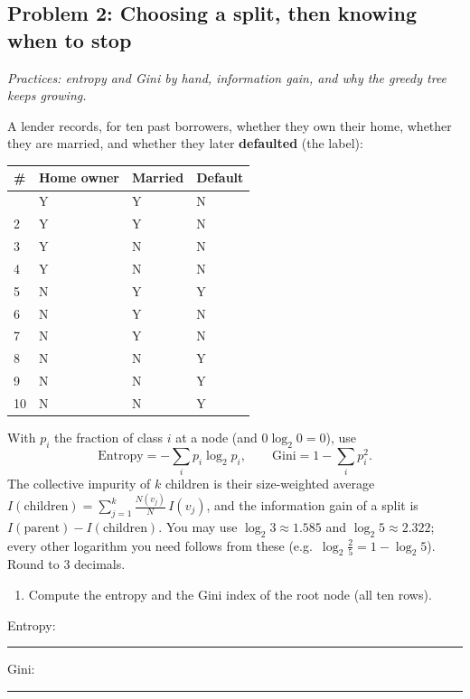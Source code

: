 \documentclass[
  11pt,
]{article}
\newcounter{none} %
\providecommand{\tightlist}{%
  \setlength{\itemsep}{0pt}\setlength{\parskip}{0pt}}
\newcommand{\blank}[1][1.2in]{\rule{#1}{0.4pt}}
\newcommand{\answerpage}{\clearpage}
\begin{document}
\answerpage

\subsection{Problem 2: Choosing a split, then knowing when to
stop}\label{problem-2-choosing-a-split-then-knowing-when-to-stop}

\emph{Practices: entropy and Gini by hand, information gain, and why the
greedy tree keeps growing.}

A lender records, for ten past borrowers, whether they own their home,
whether they are married, and whether they later \textbf{defaulted} (the
label):

{\def\LTcaptype{none} %
\begin{longtable}[]{@{}llll@{}}
\toprule\noalign{}
\# & Home owner & Married & Default \\
\midrule\noalign{}
\endhead
\bottomrule\noalign{}
\endlastfoot
1 & Y & Y & N \\
2 & Y & Y & N \\
3 & Y & N & N \\
4 & Y & N & N \\
5 & N & Y & Y \\
6 & N & Y & N \\
7 & N & Y & N \\
8 & N & N & Y \\
9 & N & N & Y \\
10 & N & N & Y \\
\end{longtable}
}

With \(p_i\) the fraction of class \(i\) at a node (and
\(0\log_2 0 = 0\)), use
\[\text{Entropy}=-\sum_i p_i\log_2 p_i,\qquad \text{Gini}=1-\sum_i p_i^2 .\]
The collective impurity of \(k\) children is their size-weighted average
\(I(\text{children})=\sum_{j=1}^{k}\frac{N(v_j)}{N}\,I(v_j)\), and the
information gain of a split is \(I(\text{parent})-I(\text{children})\).
You may use \(\log_2 3 \approx 1.585\) and \(\log_2 5 \approx 2.322\);
every other logarithm you need follows from these
(e.g.~\(\log_2\tfrac{2}{5} = 1 - \log_2 5\)). Round to 3 decimals.

\begin{enumerate}
\def\labelenumi{(\alph{enumi})}
\tightlist
\item
  Compute the entropy and the Gini index of the root node (all ten
  rows).
\end{enumerate}

Entropy: \blank[0.8in]\quad Gini: \blank[0.8in]
\end{document}
